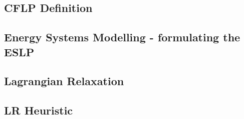 \subsection{CFLP Definition}


\subsection{Energy Systems Modelling - formulating the ESLP}


\subsection{Lagrangian Relaxation}


\subsection{LR Heuristic}





